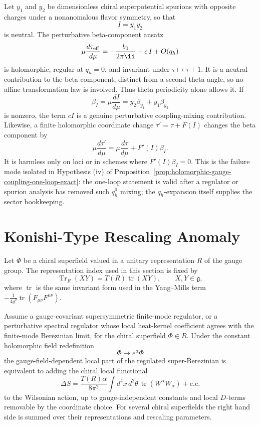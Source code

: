 \begin{example}
\label{ex:neutral-spurion-q0-boundary}
Let \(y_1\) and \(y_2\) be dimensionless chiral superpotential spurions with
opposite charges under a nonanomalous flavor symmetry, so that
\[
  I=y_1y_2
\]
is neutral.  The perturbative beta-component ansatz
\[
  \mu\frac{d\tau_{\rm eff}}{d\mu}
  =
  -\frac{b_0}{2\pi\ii}
  +
  c\,I
  +
  O(q_h)
\]
is holomorphic, regular at \(q_h=0\), and invariant under
\(\tau\mapsto\tau+1\).  It is a neutral contribution to the beta component,
distinct from a second theta angle, so no affine transformation law is
involved.  Thus theta periodicity alone allows it.  If
\[
  \beta_I
  =
  \mu\frac{dI}{d\mu}
  =
  y_2\beta_{y_1}+y_1\beta_{y_2}
\]
is nonzero, the term \(cI\) is a genuine perturbative coupling-mixing
contribution.  Likewise, a finite holomorphic coordinate change
\(\tau'=\tau+F(I)\) changes the beta component by
\[
  \mu\frac{d\tau'}{d\mu}
  =
  \mu\frac{d\tau}{d\mu}
  +
  F'(I)\beta_I .
\]
It is harmless only on loci or in schemes where \(F'(I)\beta_I=0\).  This is
the failure mode isolated in Hypothesis (iv) of
Proposition~\ref{prop:holomorphic-gauge-coupling-one-loop-exact}: the
one-loop statement is valid after a regulator or spurion analysis has removed
such \(q_h^0\) mixing; the \(q_h\)-expansion itself supplies the sector
bookkeeping.
\end{example}

\section{Konishi-Type Rescaling Anomaly}

Let \(\Phi\) be a chiral superfield valued in a unitary representation \(R\)
of the gauge group.  The representation index used in this section is fixed
by
\[
  \operatorname{Tr}_{R}(XY)=T(R)\operatorname{tr}(XY),
  \qquad X,Y\in\mathfrak g,
\]
where \(\operatorname{tr}\) is the same invariant form used in the
Yang--Mills term
\(-\frac1{4g^2}\operatorname{tr}(F_{\mu\nu}F^{\mu\nu})\).

\begin{proposition}
\label{prop:konishi-rescaling-jacobian}
Assume a gauge-covariant supersymmetric finite-mode regulator, or a
perturbative spectral regulator whose local heat-kernel coefficient agrees
with the finite-mode Berezinian limit, for the chiral superfield
\(\Phi\in R\).  Under the constant holomorphic field redefinition
\[
  \Phi\mapsto e^{\alpha}\Phi
\]
the gauge-field-dependent local part of the regulated super-Berezinian is
equivalent to adding the chiral local functional
\[
  \Delta S
  =
  \frac{T(R)\alpha}{8\pi^2}
  \int d^4x\,d^2\theta\,\operatorname{tr}(W^\alpha W_\alpha)
  +\text{c.c.}
\]
to the Wilsonian action, up to gauge-independent constants and local
\(D\)-terms removable by the coordinate choice.  For several chiral
superfields the right hand side is summed over their representations and
rescaling parameters.
\end{proposition}

